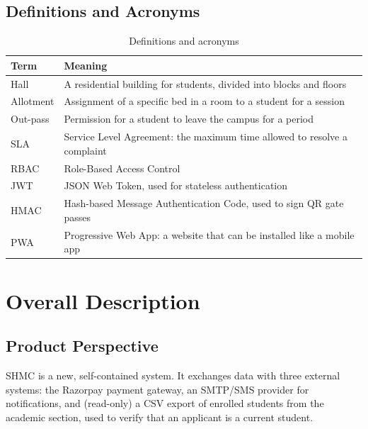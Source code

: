 \documentclass[11pt,a4paper]{report}
\begin{document}
\subsection{Definitions and Acronyms}
\begin{table}[H]
\centering\small
\caption{Definitions and acronyms}\label{tab:defs}
\begin{tabularx}{\textwidth}{lL}
\toprule
\textbf{Term} & \textbf{Meaning}\\
\midrule
Hall & A residential building for students, divided into blocks and floors\\
Allotment & Assignment of a specific bed in a room to a student for a session\\
Out-pass & Permission for a student to leave the campus for a period\\
SLA & Service Level Agreement: the maximum time allowed to resolve a complaint\\
RBAC & Role-Based Access Control\\
JWT & JSON Web Token, used for stateless authentication\\
HMAC & Hash-based Message Authentication Code, used to sign QR gate passes\\
PWA & Progressive Web App: a website that can be installed like a mobile app\\
\bottomrule
\end{tabularx}
\end{table}

\section{Overall Description}
\subsection{Product Perspective}
SHMC is a new, self-contained system. It exchanges data with three external systems: the Razorpay payment gateway, an SMTP/SMS provider for notifications, and (read-only) a CSV export of enrolled students from the academic section, used to verify that an applicant is a current student.
\end{document}
